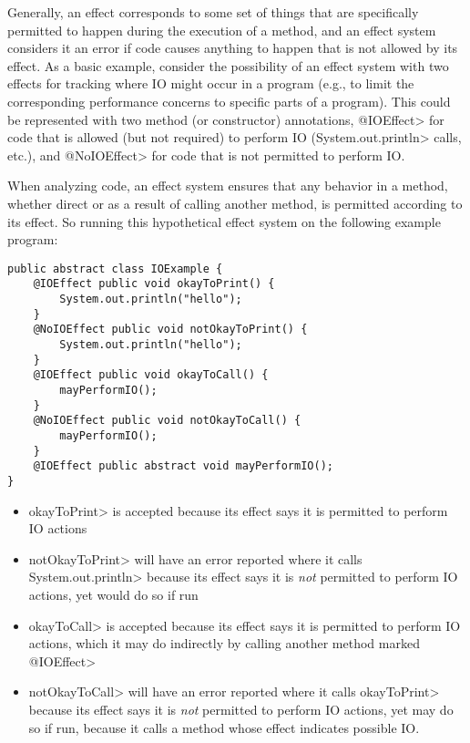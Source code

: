 Generally, an effect corresponds to some set of things that are specifically permitted to happen during the execution of a method, and an effect system considers it an error if code causes anything to happen that is not allowed by its effect.
As a basic example, consider the possibility of an effect system with two effects for tracking where IO might occur in a program (e.g., to limit the corresponding performance concerns to specific parts of a program). This could be represented with two method (or constructor) annotations, \<@IOEffect> for code that is allowed (but not required) to perform IO (\<System.out.println> calls, etc.), and \<@NoIOEffect> for code that is not permitted to perform IO.

When analyzing code, an effect system ensures that any behavior in a method, whether direct or as a result of calling another method, is permitted according to its effect.  So running this hypothetical effect system on the following example program:

\begin{Verbatim}
public abstract class IOExample {
    @IOEffect public void okayToPrint() {
        System.out.println("hello");
    }
    @NoIOEffect public void notOkayToPrint() {
        System.out.println("hello");
    }
    @IOEffect public void okayToCall() {
        mayPerformIO();
    }
    @NoIOEffect public void notOkayToCall() {
        mayPerformIO();
    }
    @IOEffect public abstract void mayPerformIO();
}
\end{Verbatim}
\begin{itemize}
    \item \<okayToPrint> is accepted because its effect says it is permitted to perform IO actions
    \item \<notOkayToPrint> will have an error reported where it calls \<System.out.println> because its effect says it is \emph{not} permitted to perform IO actions, yet would do so if run
    \item \<okayToCall> is accepted because its effect says it is permitted to perform IO actions, which it may do indirectly by calling another method marked \<@IOEffect>
    \item \<notOkayToCall> will have an error reported where it calls \<okayToPrint> because its effect says it is \emph{not} permitted to perform IO actions, yet may do so if run, because it calls a method whose effect indicates possible IO.
\end{itemize}

